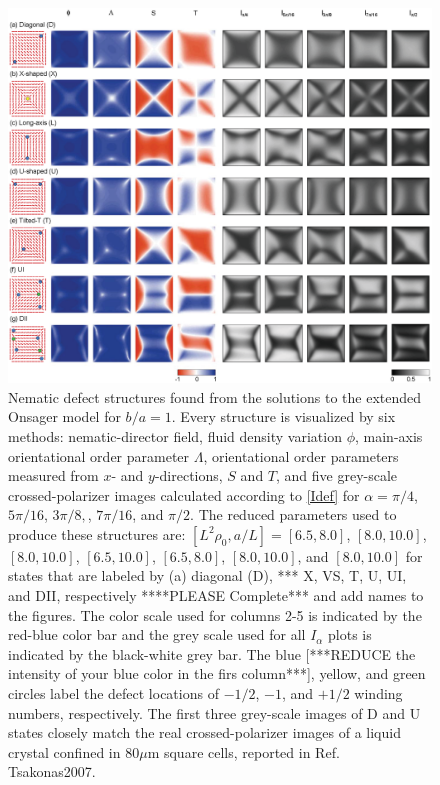 \documentclass[prl,twocolumn,preprintnumbers,reprint]{revtex4}
\newcommand*{\citen}{}%
\DeclareRobustCommand*{\citen}[1]{%
  \begingroup
    \romannumeral-`\x %
    \setcitestyle{numbers}%
    \cite{#1}%
  \endgroup
}
\begin{document}
\begin{figure}[!t]
\includegraphics[width = 2.0 \columnwidth]{eps/s_t_phiCh.eps}
\caption{Nematic defect structures found from the solutions to the extended Onsager model for $b/a=1$. Every structure is visualized by six methods: nematic-director field, fluid density variation $\phi$, main-axis orientational order parameter $\Lambda$, orientational order parameters measured from $x$- and $y$-directions, $S$ and $T$, and five grey-scale crossed-polarizer images calculated according to \eqref{Idef}
for $\alpha=\pi/4$, $5\pi/16$, $3\pi/8, $, $ 7\pi/16$, and $\pi/2$.
The reduced parameters used to produce these structures are: $[L^2 \rho_0, a/L]  = [6.5, 8.0]$, $[8.0, 10.0]$, $[8.0, 10.0]$, $[6.5, 10.0]$, $[6.5, 8.0]$, $[8.0, 10.0]$, and $[8.0, 10.0]$
for states that are labeled by (a) diagonal (D), *** X, VS, T, U, UI, and DII,
{respectively ****PLEASE Complete*** and add names to the figures.}
The color scale used for columns 2-5 is indicated by the red-blue color bar and the grey scale used for all $I_\alpha$ plots is indicated by the black-white grey bar. The blue [***REDUCE the intensity of your blue color in the firs column***], yellow, and green circles label the defect locations of $-1/2$, $-1$, and $+1/2$ winding numbers, respectively. The first three grey-scale images of D and U states closely match the real crossed-polarizer images of a liquid crystal confined in 80$\mu$m square cells, reported in Ref. \citen{Tsakonas2007}.}\label{P1}
\end{figure}
\end{document}
